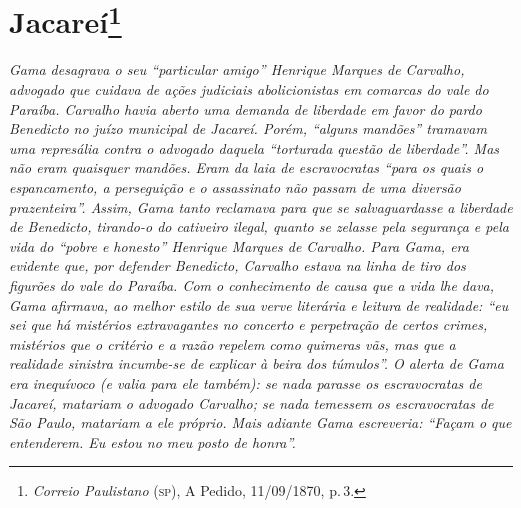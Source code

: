 \chapter{Jacareí\footnote{\emph{Correio Paulistano} (\textsc{sp}), A Pedido, 11/09/1870,
  p.\,3.}} %

\begin{didascalia}
\emph{Gama desagrava o seu ``particular amigo'' Henrique Marques de
Carvalho, advogado que cuidava de ações judiciais abolicionistas em
comarcas do vale do Paraíba. Carvalho havia aberto uma demanda de
liberdade em favor do pardo Benedicto no juízo municipal de Jacareí.
Porém, ``alguns mandões'' tramavam uma represália contra o advogado
daquela ``torturada questão de liberdade''. Mas não eram quaisquer
mandões. Eram da laia de escravocratas ``para os quais o espancamento, a
perseguição e o assassinato não passam de uma diversão prazenteira''.
Assim, Gama tanto reclamava para que se salvaguardasse a liberdade de
Benedicto, tirando-o do cativeiro ilegal, quanto se zelasse pela
segurança e pela vida do ``pobre e honesto'' Henrique Marques de Carvalho.
Para Gama, era evidente que, por defender Benedicto, Carvalho estava na
linha de tiro dos figurões do vale do Paraíba. Com o conhecimento de
causa que a vida lhe dava, Gama afirmava, ao melhor estilo de sua verve
literária e leitura de realidade: ``eu sei que há mistérios extravagantes
no concerto e perpetração de certos crimes, mistérios que o critério e a
razão repelem como quimeras vãs, mas que a realidade sinistra incumbe-se
de explicar à beira dos túmulos''. O alerta de Gama era inequívoco (e
valia para ele também): se nada parasse os escravocratas de Jacareí,
matariam o advogado Carvalho; se nada temessem os escravocratas de São
Paulo, matariam a ele próprio. Mais adiante Gama escreveria: ``Façam o
que entenderem. Eu estou no meu posto de honra''.}
\end{didascalia}


